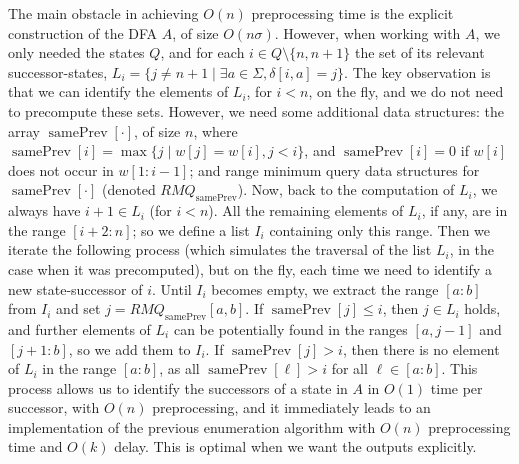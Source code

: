 \documentclass[10pt,a4paper]{amsart}
\DeclareMathOperator{\prevArray}{samePrev}
\theoremstyle{plain}
\theoremstyle{definition}
\begin{document}
The main obstacle in achieving $O(n)$ preprocessing time is the explicit construction of the DFA $A$, of size $O(n\sigma)$. However, when working with $A$, we only needed the states $Q$, and for each $i\in Q\setminus \{n,n+1\}$ the set of its relevant successor-states, $L_i=\{j\neq n+1 \mid \exists a\in \Sigma, \delta[i,a]=j\}$. The key observation is that we can identify the elements of $L_i$, for $i<n$, on the fly, and we do not need to precompute these sets. However, we need some additional data structures: the array $\prevArray[\cdot]$, of size $n$, where $\prevArray[i]= \max \lbrace j \mid w[j] = w[i], j < i \rbrace$, and $\prevArray[i] = 0$ if $w[i] $ does not occur in $w[1:i-1]$; and range minimum query data structures for $\prevArray[\cdot]$ (denoted $RMQ_{\prevArray}$). Now, back to the computation of $L_i$, we always have $i+1\in L_i$ (for $i<n$). All the remaining elements of $L_i$, if any, are in the range $[i+2:n]$; so we define a list $I_i$ containing only this range. Then we iterate the following process (which simulates the traversal of the list $L_i$, in the case when it was precomputed), but on the fly, each time we need to identify a new state-successor of $i$. Until $I_i$ becomes empty, we extract the range $[a:b]$ from $I_i$ and set $j=RMQ_{\prevArray}[a,b]$. If $\prevArray[j]\leq i$, then $j\in L_i$ holds, and further elements of $L_i$ can be potentially found in the ranges $[a,j-1]$ and $[j+1:b]$, so we add them to $I_i$. If $\prevArray[j]> i$, then there is no element of $L_i$ in the range $[a:b]$, as all $\prevArray[\ell]>i$ for all $\ell\in [a:b]$. This process allows us to identify the successors of a state in $A$ in $O(1)$ time per successor, with $O(n)$ preprocessing, and it immediately leads to an implementation of the previous enumeration algorithm with $O(n)$ preprocessing time and $O(k)$ delay. This is optimal when we want the outputs explicitly. 
\end{document}
